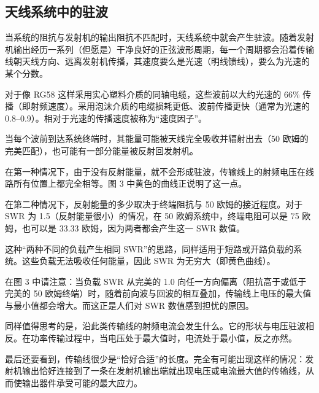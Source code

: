 \documentclass[11pt]{article}
\begin{document}
\subsection*{天线系统中的驻波}

当系统的阻抗与发射机的输出阻抗不匹配时，天线系统中就会产生驻波。随着发射机输出经历一系列（但愿是）干净良好的正弦波形周期，每一个周期都会沿着传输线朝天线方向、远离发射机传播，其速度要么是光速（明线馈线），要么为光速的某个分数。

对于像 RG58 这样采用实心塑料介质的同轴电缆，这些波前以大约光速的 66\% 传播（即射频速度）。采用泡沫介质的电缆损耗更低、波前传播更快（通常为光速的 0.8--0.9）。相对于光速的传播速度被称为“速度因子”。

当每个波前到达系统终端时，其能量可能被天线完全吸收并辐射出去（50 欧姆的完美匹配），也可能有一部分能量被反射回发射机。

在第一种情况下，由于没有反射能量，就不会形成驻波，传输线上的射频电压在线路所有位置上都完全相等。图 3 中黄色的曲线正说明了这一点。

在第二种情况下，反射能量的多少取决于终端阻抗与 50 欧姆的接近程度。对于 SWR 为 1.5（反射能量很小）的情况，在 50 欧姆系统中，终端电阻可以是 75 欧姆，也可以是 33.33 欧姆，因为两者都会产生这一 SWR 数值。

这种“两种不同的负载产生相同 SWR”的思路，同样适用于短路或开路负载的系统。这些负载无法吸收任何能量，因此 SWR 为无穷大（即黄色曲线）。

在图 3 中请注意：当负载 SWR 从完美的 1.0 向任一方向偏离（阻抗高于或低于完美的 50 欧姆终端）时，随着前向波与回波的相互叠加，传输线上电压的最大值与最小值都会增大。而这正是人们对 SWR 数值感到担忧的原因。

同样值得思考的是，沿此类传输线的射频电流会发生什么。它的形状与电压驻波相反。在功率传输过程中，当电压处于最大值时，电流处于最小值，反之亦然。

最后还要看到，传输线很少是“恰好合适”的长度。完全有可能出现这样的情况：发射机输出恰好连接到了一条在发射机输出端就出现电压或电流最大值的传输线，从而使输出器件承受可能的最大应力。
\end{document}
